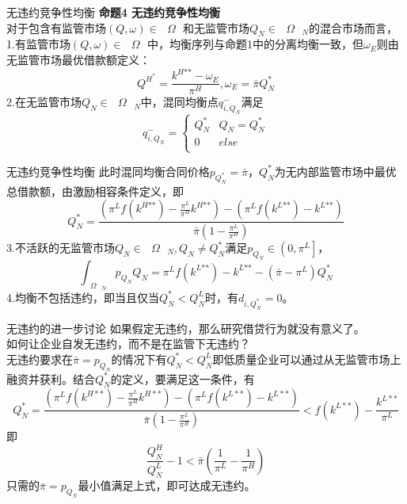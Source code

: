 \documentclass{beamer}
\begin{document}
\begin{frame}{无违约竞争性均衡}
	\textbf{命题4 无违约竞争性均衡}\\
	对于包含有监管市场$\left( Q,\omega  \right)\in \text{ }\!\!\Omega\!\!\text{ }$和无监管市场${{Q}_{N}}\in {{\text{ }\!\!\Omega\!\!\text{ }}_{N}}$的混合市场而言，\\
	1.有监管市场$\left( Q,\omega  \right)\in \text{ }\!\!\Omega\!\!\text{ }$中，均衡序列与命题1中的分离均衡一致，但${{\omega }_{E}}$则由无监管市场最优借款额定义：
	$${{Q}^{{{H}^{\text{*}}}}}=\frac{{{k}^{H\text{**}}}-{{\omega }_{E}}}{{{\pi }^{H}}},{{\omega }_{E}}=\bar{\pi }Q_{N}^{\text{*}}$$
	2.在无监管市场${{Q}_{N}}\in {{\text{ }\!\!\Omega\!\!\text{ }}_{N}}$中，混同均衡点$q_{i,{{Q}_{N}}}^{-}$满足
	$$q_{i,{{Q}_{N}}}^{-}=\left\{ \begin{matrix}
		Q_{N}^{\text{*}} & {{Q}_{N}}=Q_{N}^{\text{*}}  \\
		0 &  else \\
	\end{matrix} \right.$$

\end{frame}

\begin{frame}{无违约竞争性均衡}
	此时混同均衡合同价格${{p}_{Q_{N}^{*}}}=\bar{\pi }$，$Q_{N}^{*}$为无内部监管市场中最优总借款额，由激励相容条件定义，即
	$$Q_{N}^{\text{*}}=\frac{\left( {{\pi }^{L}}f\left( {{k}^{H\text{**}}} \right)-\frac{{{\pi }^{L}}}{{{\pi }^{H}}}{{k}^{H\text{**}}} \right)-\left( {{\pi }^{L}}f\left( {{k}^{L\text{**}}} \right)-{{k}^{L\text{**}}} \right)}{\bar{\pi }\left( 1-\frac{{{\pi }^{L}}}{{{\pi }^{H}}} \right)}$$
	3.不活跃的无监管市场${{Q}_{N}}\in {{\text{ }\!\!\Omega\!\!\text{ }}_{N}},{{Q}_{N}}\ne Q_{N}^{\text{*}}$满足${{p}_{{{Q}_{N}}}}\in \left( 0,{{\pi }^{L}} \right]$，
	$$\mathop{\int }_{{{\text{ }\!\!\Omega\!\!\text{ }}_{N}}}{{p}_{{{Q}_{N}}}}{{Q}_{N}}={{\pi }^{L}}f\left( {{k}^{L\text{**}}} \right)-{{k}^{L\text{**}}}-\left( \bar{\pi }-{{\pi }^{L}} \right)Q_{N}^{\text{*}}$$
	4.均衡不包括违约，即当且仅当$Q_{N}^{\text{*}}<Q_{N}^{L}$时，有${{d}_{i,Q_{N}^{\text{*}}}}=0$。
\end{frame}

\begin{frame}{无违约的进一步讨论}
	如果假定无违约，那么研究借贷行为就没有意义了。\\
	如何让企业自发无违约，而不是在监管下无违约？\\
	无违约要求在$ \bar{\pi}=p_{Q_N} $的情况下有$ Q_{N}^{*} <Q_{N}^{L} $即低质量企业可以通过从无监管市场上融资并获利。结合$ Q_{N}^{*}$的定义，要满足这一条件，有
	$$Q_{N}^{*}=\frac{\left( {{\pi }^{L}}f\left( {{k}^{H**}} \right)-\frac{{{\pi }^{L}}}{{{\pi }^{H}}}{{k}^{H**}} \right)-\left( {{\pi }^{L}}f\left( {{k}^{L**}} \right)-{{k}^{L**}} \right)}{\bar{\pi }\left( 1-\frac{{{\pi }^{L}}}{{{\pi }^{H}}} \right)}<f\left( {{k}^{L**}} \right)-\frac{{{k}^{L**}}}{{{\pi }^{L}}}$$
	即
	$$\frac{Q_{N}^{H}}{Q_{N}^{L}}-1<\bar{\pi }\left( \frac{1}{{{\pi }^{L}}}-\frac{1}{{{\pi }^{H}}} \right)$$
	只需的$ \bar{\pi}=p_{Q_N} $最小值满足上式，即可达成无违约。
\end{frame}
\end{document}
